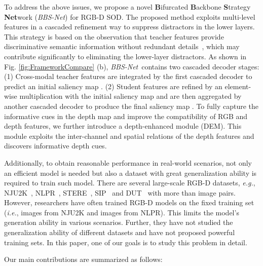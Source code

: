 \documentclass[journal]{IEEEtran}
\newcommand{\figref}[1]{Fig. \ref{#1}}
\def\ie{\emph{i.e.}}
\def\eg{\emph{e.g.}}
\def\ourmodel{\emph{BBS-Net}}
\begin{document}
To address the above issues, we propose a novel \textbf{B}ifurcated \textbf{B}ackbone \textbf{S}trategy \textbf{Net}work (\ourmodel) for RGB-D SOD.
The proposed method exploits multi-level features in a cascaded refinement way to suppress distractors in the lower layers.
This strategy is based on the observation that teacher features provide discriminative semantic information without redundant details~\cite{Liu2019SPBD,Wu2019CPD}, which may contribute significantly to eliminating the lower-layer distractors.
As shown in \figref{fig:FrameworkCompare} (b), \ourmodel~contains two cascaded decoder stages:
(1) Cross-modal teacher features are integrated by the first cascaded decoder  to predict an initial saliency map .
(2) Student features are refined by an
element-wise multiplication with the initial saliency map  and are then aggregated
by another cascaded decoder  to produce the final saliency map .
To fully capture the informative cues in the depth map and improve the compatibility of RGB and depth features, we further introduce a depth-enhanced module (DEM). This module exploits the inter-channel and spatial relations of the depth features and discovers informative depth cues.


Additionally, to obtain reasonable performance in real-world scenarios, not only an efficient model is needed but also a dataset with great generalization ability is required to train such model.
There are several large-scale RGB-D datasets, \eg, NJU2K~\cite{ju2014ACSD}, NLPR~\cite{peng2014LHM}, STERE~\cite{niu2012STERE},
SIP~\cite{fan2019D3Net} and DUT~\cite{piao2019DMRA} with more than  image pairs.
However, researchers have often trained RGB-D models on the fixed training set (\ie,  images from NJU2K and  images from NLPR). This limits the model's generation ability in various scenarios.
Further, they have not studied the generalization ability of different datasets and have not proposed powerful training sets.
In this paper, one of our goals is to study this problem in detail.

Our main contributions are summarized as follows:
\end{document}
